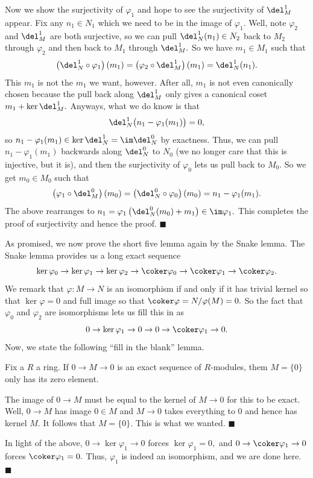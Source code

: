 Now we show the surjectivity of $\varphi_1$ and hope to see the surjectivity of $\del_M^1$ appear. Fix any $n_1\in N_1$ which we need to be in the image of $\varphi_1.$ Well, note $\varphi_2$ and $\del_M^1$ are both surjective, so we can pull $\del_N^1(n_1)\in N_2$ back to $M_2$ through $\varphi_2$ and then back to $M_1$ through $\del_M^1.$ So we have $m_1\in M_1$ such that
\[\left(\del_N^1\circ\varphi_1\right)(m_1)=\left(\varphi_2\circ\del_M^1\right)(m_1)=\del_N^1(n_1).\]
This $m_1$ is not the $m_1$ we want, however. After all, $m_1$ is not even canonically chosen because the pull back along $\del_M^1$ only gives a canonical coset $m_1+\ker\del_M^1.$ Anyways, what we do know is that
\[\del_N^1\big(n_1-\varphi_1(m_1)\big)=0,\]
so $n_1-\varphi_1(m_1)\in\ker\del_N^1=\im\del_N^0$ by exactness. Thus, we can pull $n_1-\varphi_1(m_1)$ backwards along $\del_N^0$ to $N_0$ (we no longer care that this is injective, but it is), and then the surjectivity of $\varphi_0$ lets us pull back to $M_0.$ So we get $m_0\in M_0$ such that
\[\left(\varphi_1\circ\del_M^0\right)(m_0)=\left(\del_N^0\circ\varphi_0\right)(m_0)=n_1-\varphi_1(m_1).\]
The above rearranges to $n_1=\varphi_1\left(\del_N^0(m_0)+m_1\right)\in\im\varphi_1.$ This completes the proof of surjectivity and hence the proof. $\blacksquare$

As promised, we now prove the short five lemma again by the Snake lemma. The Snake lemma provides us a long exact sequence
\[\ker\varphi_0\to\ker\varphi_1\to\ker\varphi_2\to\coker\varphi_0\to\coker\varphi_1\to\coker\varphi_2.\]
We remark that $\varphi:M\to N$ is an isomorphism if and only if it has trivial kernel so that $\ker\varphi=0$ and full image so that $\coker\varphi=N/\varphi(M)=0.$ So the fact that $\varphi_0$ and $\varphi_2$ are isomorphisms lets us fill this in as
\[0\to\ker\varphi_1\to0\to0\to\coker\varphi_1\to0.\]
Now, we state the following ``fill in the blank'' lemma.
\begin{lemma}
    Fix a $R$ a ring. If $0\to M\to 0$ is an exact sequence of $R$-modules, them $M=\{0\}$ only has its zero element.
\end{lemma}
The image of $0\to M$ must be equal to the kernel of $M\to 0$ for this to be exact. Well, $0\to M$ has image $0\in M$ and $M\to 0$ takes everything to $0$ and hence has kernel $M.$ It follows that $M=\{0\}.$ This is what we wanted. $\blacksquare$

In light of the above, $0\to\ker\varphi_1\to0$ forces $\ker\varphi_1=0,$ and $0\to\coker\varphi_1\to0$ forces $\coker\varphi_1=0.$ Thus, $\varphi_1$ is indeed an isomorphism, and we are done here. $\blacksquare$

